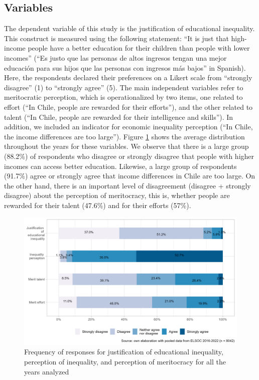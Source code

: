 \documentclass[
  12pt,
  a4paper,
]{article}
\begin{document}
\subsection{Variables}\label{variables}

The dependent variable of this study is the justification of educational inequality. This construct is measured using the following statement: ``It is just that high-income people have a better education for their children than people with lower incomes'' (``Es justo que las personas de altos ingresos tengan una mejor educación para sus hijos que las personas con ingresos más bajos'' in Spanish). Here, the respondents declared their preferences on a Likert scale from ``strongly disagree'' (1) to ``strongly agree'' (5). The main independent variables refer to meritocratic perception, which is operationalized by two items, one related to effort (``In Chile, people are rewarded for their efforts''), and the other related to talent (``In Chile, people are rewarded for their intelligence and skills''). In addition, we included an indicator for economic inequality perception (``In Chile, the income differences are too large''). Figure \ref{fig:frecuencies} shows the average distribution throughout the years for these variables. We observe that there is a large group (88.2\%) of respondents who disagree or strongly disagree that people with higher incomes can access better education. Likewise, a large group of respondents (91.7\%) agree or strongly agree that income differences in Chile are too large. On the other hand, there is an important level of disagreement (disagree + strongly disagree) about the perception of meritocracy, this is, whether people are rewarded for their talent (47.6\%) and for their efforts (57\%).

\begin{figure}[H]

{\centering \includegraphics[width=0.85\linewidth]{output/graphs/merit_plot} 

}

\caption{Frequency of responses for justification of educational inequality, perception of inequality, and perception of meritocracy for all the years analyzed}\label{fig:frecuencies}
\end{figure}
\end{document}

